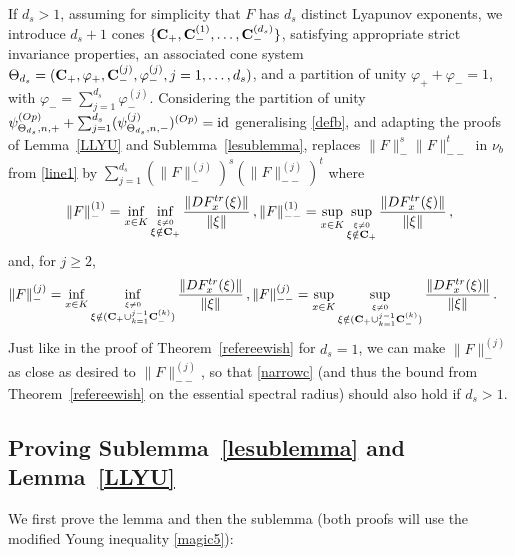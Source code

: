 \documentclass[10pt,twoside]{amsart}
\begin{document}
\begin{remark}\label{codim}
If $d_s >1$, assuming for simplicity that $F$ has
$d_s$ distinct Lyapunov exponents, we  introduce
 $d_s+1$ cones 
$\{\mathbf{C}_+, \mathbf{C}_-^{(1)}, \ldots , \mathbf{C}_-^{(d_s)}\}$, 
satisfying appropriate strict invariance properties,
an  associated cone system
$\Theta_{d_s}=(\mathbf{C}_+, \varphi_+,\mathbf{C}_-^{(j)},  \varphi_-^{(j)}, j=1, \ldots, d_s)$,   
and a
partition of unity 
$\varphi_++\varphi_-=1$, with $\varphi_-=\sum_{j=1}^{d_s} \varphi_-^{(j)}$.  Considering 
the partition of unity
$\psi^{(Op)}_{\Theta_{d_s}, n,+}+\sum_{j=1}^{d_s} (\psi_{\Theta_{d_s}, n,-}^{(j)})^{(Op)}
=\mathrm{id}$ generalising \eqref{defb}, 
and adapting the proofs of
Lemma~\ref{LLYU} and Sublemma~\ref{lesublemma}, replaces $\|F\|_-^{s}\|F\|_{--}^t$
in $\nu_b$ from \eqref{line1} by 
$
\sum_{j=1}^{d_s} (\|F\|^{(j)}_-)^{s}(\|F\|^{(j)}_{--})^t
$
where
$$
\|F\|^{(1)}_{-}
=\inf_{x\in K}
\inf_{\stackrel{\xi\ne 0 }{ \xi \notin \mathbf{C}_{+}}} \frac{\|DF_x^{tr}(\xi)\|}{\|\xi\|}\, ,
\|F\|^{(1)}_{--}
=\sup_{x\in K}
\sup_{\stackrel{\xi\ne 0 }{ \xi \notin \mathbf{C}_{+}}} \frac{\|DF_x^{tr}(\xi)\|}{\|\xi\|} \, , 
$$
and, for $j\ge 2$,
\begin{align*}
\|F\|^{(j)}_{-}
&=\inf_{x\in K}
\inf_{\stackrel{\xi\ne 0 }{ \xi \notin (\mathbf{C}_+ \cup_{k=1}^{j-1}\mathbf{C}^{(k)}_{-})
}} \frac{\|DF_x^{tr}(\xi)\|}{\|\xi\|}\, ,
\|F\|^{(j)}_{--}
=\sup_{x\in K}
\sup_{\stackrel{\xi\ne 0 }{ \xi \notin  (\mathbf{C}_+ \cup_{k=1}^{j-1}\mathbf{C}^{(k)}_{-})  }} \frac{\|DF_x^{tr}(\xi)\|}{\|\xi\|}\, .
\end{align*} 
Just like in the proof of Theorem~\ref{refereewish} for $d_s=1$, we can make $\|F\|^{(j)}_-$
as close as desired to $\|F\|^{(j)}_{--}$, so that \eqref{narrowc} (and thus the bound from
Theorem~\ref{refereewish}
on the essential spectral radius) should also hold
if $d_s > 1$.
\end{remark}





\subsection{Proving Sublemma~\ref{lesublemma}
and Lemma~\ref{LLYU}}
\label{postt}






We first prove the lemma and then the sublemma (both proofs will use the
modified Young inequality \eqref{magic5}):
\end{document}
